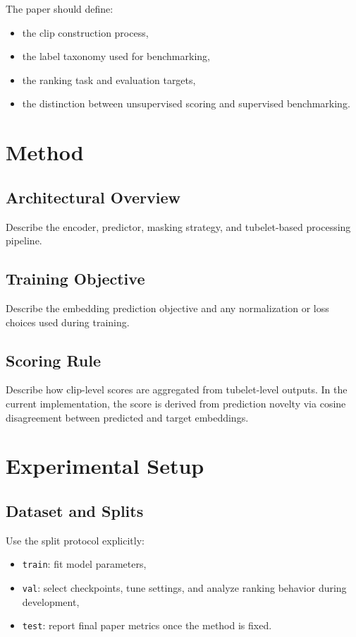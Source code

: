 \documentclass[10pt,twocolumn,letterpaper]{article}
\begin{document}
The paper should define:
\begin{itemize}
    \item the clip construction process,
    \item the label taxonomy used for benchmarking,
    \item the ranking task and evaluation targets,
    \item the distinction between unsupervised scoring and supervised benchmarking.
\end{itemize}

\section{Method}
\subsection{Architectural Overview}
Describe the encoder, predictor, masking strategy, and tubelet-based processing pipeline.

\subsection{Training Objective}
Describe the embedding prediction objective and any normalization or loss choices used during training.

\subsection{Scoring Rule}
Describe how clip-level scores are aggregated from tubelet-level outputs. In the current implementation, the score is derived from prediction novelty via cosine disagreement between predicted and target embeddings.

\section{Experimental Setup}
\subsection{Dataset and Splits}
Use the split protocol explicitly:
\begin{itemize}
    \item \texttt{train}: fit model parameters,
    \item \texttt{val}: select checkpoints, tune settings, and analyze ranking behavior during development,
    \item \texttt{test}: report final paper metrics once the method is fixed.
\end{itemize}
\end{document}
